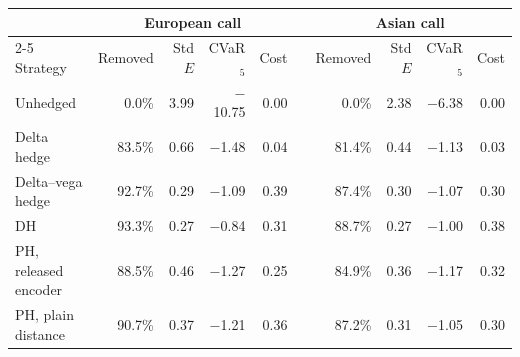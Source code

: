\begin{tabular}{@{}lrrrrcrrrr@{}}
\toprule
 & \multicolumn{4}{c}{European call} && \multicolumn{4}{c}{Asian call} \\
\cmidrule{2-5}\cmidrule{7-10}
Strategy & Removed & Std $E$ & CVaR$_{5}$ & Cost && Removed & Std $E$ & CVaR$_{5}$ & Cost \\
\midrule
Unhedged & 0.0\% & 3.99 & $-$10.75 & 0.00 && 0.0\% & 2.38 & $-$6.38 & 0.00 \\
Delta hedge & 83.5\% & 0.66 & $-$1.48 & 0.04 && 81.4\% & 0.44 & $-$1.13 & 0.03 \\
Delta--vega hedge & 92.7\% & 0.29 & $-$1.09 & 0.39 && 87.4\% & 0.30 & $-$1.07 & 0.30 \\
\midrule
DH & 93.3\% & 0.27 & $-$0.84 & 0.31 && 88.7\% & 0.27 & $-$1.00 & 0.38 \\
PH, released encoder & 88.5\% & 0.46 & $-$1.27 & 0.25 && 84.9\% & 0.36 & $-$1.17 & 0.32 \\
PH, plain distance & 90.7\% & 0.37 & $-$1.21 & 0.36 && 87.2\% & 0.31 & $-$1.05 & 0.30 \\
\bottomrule
\end{tabular}
